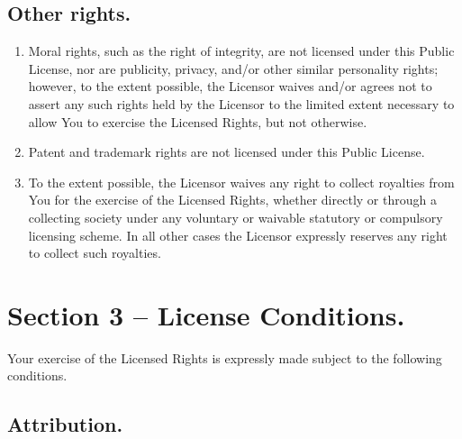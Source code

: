 \documentclass[a4paper, 12pt]{article}
\begin{document}
\subsection{Other rights.}

\begin{enumerate}
\item  Moral rights, such as the right of integrity, are not licensed under this Public License, nor are publicity, privacy, and/or other similar personality rights; however, to the extent possible, the Licensor waives and/or agrees not to assert any such rights held by the Licensor to the limited extent necessary to allow You to exercise the Licensed Rights, but not otherwise.
\item Patent and trademark rights are not licensed under this Public License.
\item To the extent possible, the Licensor waives any right to collect royalties from You for the exercise of the Licensed Rights, whether directly or through a collecting society under any voluntary or waivable statutory or compulsory licensing scheme. In all other cases the Licensor expressly reserves any right to collect such royalties.
\end{enumerate}

\setcounter{subsection}{0}

\section*{Section 3 – License Conditions.}

Your exercise of the Licensed Rights is expressly made subject to the following conditions.

\subsection{Attribution.}
\end{document}
